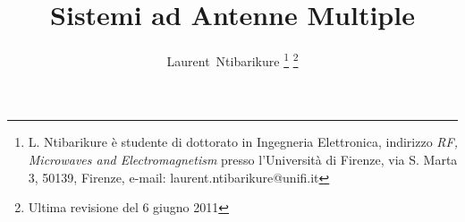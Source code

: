 \documentclass[technote]{IEEEtran}
\begin{document}
%
\title{Sistemi ad Antenne Multiple}

%
%
%

\author{Laurent~Ntibarikure \thanks{L. Ntibarikure è studente di dottorato in Ingegneria Elettronica, indirizzo \textit{RF, Microwaves and Electromagnetism} presso l'Università di Firenze, via S. Marta 3, 50139, Firenze, e-mail: laurent.ntibarikure@unifi.it}
\thanks{Ultima revisione del 6 giugno 2011}
}

% 
%
\end{document}
